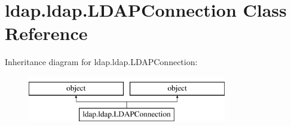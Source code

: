 \hypertarget{classldap_1_1ldap_1_1LDAPConnection}{\section{ldap.\-ldap.\-L\-D\-A\-P\-Connection Class Reference}
\label{classldap_1_1ldap_1_1LDAPConnection}
}
Inheritance diagram for ldap.\-ldap.\-L\-D\-A\-P\-Connection\-:\begin{figure}[H]
\begin{center}
\leavevmode
\includegraphics[height=2.000000cm]{classldap_1_1ldap_1_1LDAPConnection}
\end{center}
\end{figure}
